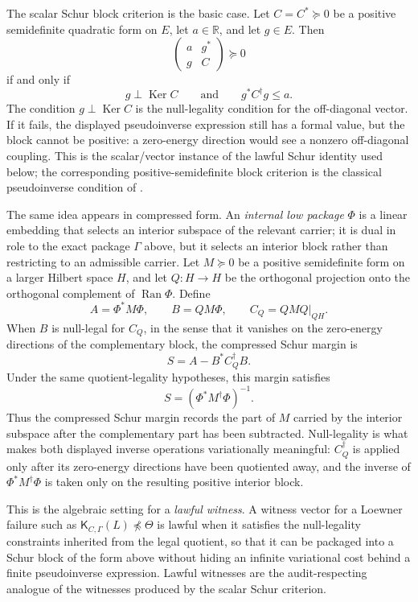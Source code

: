 \documentclass[11pt]{article}
\DeclareMathOperator{\Ran}{Ran}
\DeclareMathOperator{\Ker}{Ker}
\newcommand{\K}{\mathsf K}
\newcommand{\preceqq}{\preceq}
\theoremstyle{definition}
\begin{document}
The scalar Schur block criterion is the basic case.  Let
\(C=C^*\succeq 0\) be a positive semidefinite quadratic form on \(E\),
let \(a\in\mathbb R\), and let \(g\in E\).  Then
\[
  \begin{pmatrix}
    a & g^*\\
    g & C
  \end{pmatrix}\succeq 0
\]
if and only if
\[
  g\perp\Ker C
  \qquad\text{and}\qquad
  g^*C^\dagger g\le a.
\]
The condition \(g\perp\Ker C\) is the null-legality condition for the
off-diagonal vector.  If it fails, the displayed pseudoinverse
expression still has a formal value, but the block cannot be positive:
a zero-energy direction would see a nonzero off-diagonal coupling.  This
is the scalar/vector instance of the lawful Schur identity used below;
the corresponding positive-semidefinite block criterion is the
classical pseudoinverse condition of \citet{Albert1969PSDPartitioned}.

The same idea appears in compressed form.  An \emph{internal low
package} \(\Phi\) is a linear embedding that selects an interior
subspace of the relevant carrier; it is dual in role to the exact
package \(\Gamma\) above, but it selects an interior block rather than
restricting to an admissible carrier.  Let \(M\succeq 0\) be a positive
semidefinite form on a larger Hilbert space \(H\), and let
\(Q:H\to H\) be the orthogonal projection onto the orthogonal complement
of \(\Ran\Phi\).  Define
\[
  A=\Phi^*M\Phi,\qquad
  B=QM\Phi,\qquad
  C_Q=QMQ|_{QH}.
\]
When \(B\) is null-legal for \(C_Q\), in the sense that it vanishes on
the zero-energy directions of the complementary block, the compressed
Schur margin is
\[
  S=A-B^*C_Q^\dagger B.
\]
Under the same quotient-legality hypotheses, this margin satisfies
\[
  S=(\Phi^*M^\dagger\Phi)^{-1}.
\]
Thus the compressed Schur margin records the part of \(M\) carried by
the interior subspace after the complementary part has been subtracted.
Null-legality is what makes both displayed inverse operations
variationally meaningful: \(C_Q^\dagger\) is applied only after its
zero-energy directions have been quotiented away, and the inverse of
\(\Phi^*M^\dagger\Phi\) is taken only on the resulting positive
interior block.

This is the algebraic setting for a \emph{lawful witness}.  A witness
vector for a Loewner failure such as
\(\K_{C,\Gamma}(L)\not\preceqq\Theta\) is lawful when it satisfies the
null-legality constraints inherited from the legal quotient, so that it
can be packaged into a Schur block of the form above without hiding an
infinite variational cost behind a finite pseudoinverse expression.
Lawful witnesses are the audit-respecting analogue of the witnesses
produced by the scalar Schur criterion.
\end{document}
